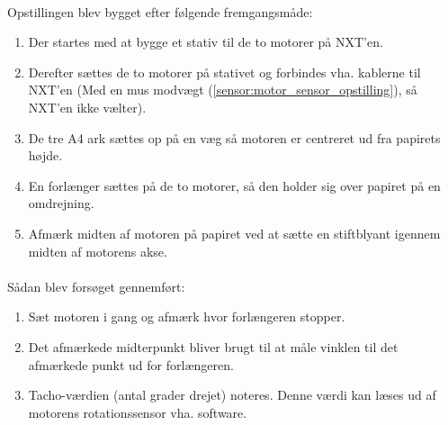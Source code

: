 \paragraph{}

Opstillingen blev bygget efter følgende fremgangsmåde:

\begin{enumerate}
\item Der startes med at bygge et stativ til de to motorer på NXT'en.
\item Derefter sættes de to motorer på stativet og forbindes vha. kablerne til NXT'en (Med en mus modvægt (\cref{sensor:motor_sensor_opstilling}), så NXT'en ikke vælter).
\item De tre A4 ark sættes op på en væg så motoren er centreret ud fra papirets højde.
\item En forlænger sættes på de to motorer, så den holder sig over papiret på en omdrejning.
\item Afmærk midten af motoren på papiret ved at sætte en stiftblyant igennem midten af motorens akse.
\end{enumerate}

\paragraph{}
Sådan blev forsøget gennemført:

\begin{enumerate}
\item Sæt motoren i gang og afmærk hvor forlængeren stopper.
\item Det afmærkede midterpunkt bliver brugt til at måle vinklen til det afmærkede punkt ud for forlængeren.
\item Tacho-værdien (antal grader drejet) noteres. 
Denne værdi kan læses ud af motorens rotationssensor vha. software.
\end{enumerate}

